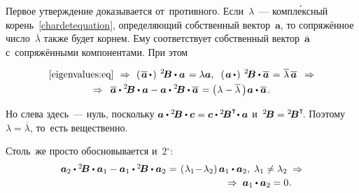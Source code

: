 \begin{otherlanguage}{russian}
Первое утверждение доказывается от~противного. Если~$\lambda$~--- компл\'{е}ксный корень~\eqref{chardetequation}, определяющий собственный вектор~$\bm{a}$, то сопряжённое число~$\overline{\lambda}$ также будет корнем. Ему соответствует собственный вектор~$\overline{\bm{a}}$ с~сопряжёнными компонентами. При этом

\nopagebreak\vspace{-0.4em}\begin{multline*}
\eqref{eigenvalues:eq}
\:\,\Rightarrow\:\,
\left(\hspace{.25ex} {\overline{\bm{a}} \, \dotp} \hspace{.25ex}\right) \hspace{0.5ex} {^2\!\bm{B}} \dotp \bm{a} \hspace{0.2ex} = \lambda \bm{a}, \;\;
\left(\hspace{0.2ex}{\bm{a} \, \dotp}\hspace{0.2ex}\right) \hspace{0.5ex} {^2\!\bm{B}} \dotp \overline{\bm{a}} \hspace{0.2ex} = \hspace{0.1ex} \overline{\lambda} \, \overline{\bm{a}}
\:\;\Rightarrow \\[-0.1em]
%
\Rightarrow\;\: \overline{\bm{a}} \dotp {^2\!\bm{B}} \dotp \bm{a} - \bm{a} \dotp {^2\!\bm{B}} \dotp \overline{\bm{a}} \hspace{0.2ex} = \left(\hspace{0.1ex}{\lambda - \overline{\lambda}}\hspace{0.16em}\right)\hspace{-0.1em} \bm{a} \dotp \overline{\bm{a}} \hspace{.2ex} .
\end{multline*}

\vspace{-0.16em} \noindent Но слева здесь~--- нуль, поскольку ${\bm{a} \dotp {^2\!\bm{B}} \dotp \bm{c} = \bm{c} \dotp {^2\!\bm{B}^{\T}\!} \dotp \bm{a}}$ и~${{^2\!\bm{B}} = {^2\!\bm{B}^{\T}\!}}$. Поэтому ${\lambda = \overline{\lambda}}$, то~есть вещественно.

Столь~же просто обосновывается и~2$^{\circ}$:
\vspace{0.2em}\[\begin{array}{c}
\tikzmark{BeginEqualsZeroBrace} {\bm{a}_2 \dotp {^2\!\bm{B}} \dotp \bm{a}_1 - \bm{a}_1 \dotp {^2\!\bm{B}} \dotp \bm{a}_2} \hspace{0.1ex} \tikzmark{EndEqualsZeroBrace} = \hspace{0.2ex} \left(\hspace{0.1ex}{\lambda_1 \!-\! \lambda_2}\right) \bm{a}_1 \dotp \bm{a}_2, \; \lambda_1 \neq \lambda_2 \;\Rightarrow \\[0.2em]
\hspace{16em} \Rightarrow\; \bm{a}_1 \dotp \bm{a}_2 = 0 \hspace{0.1ex}.
\end{array}\]


\end{otherlanguage}
